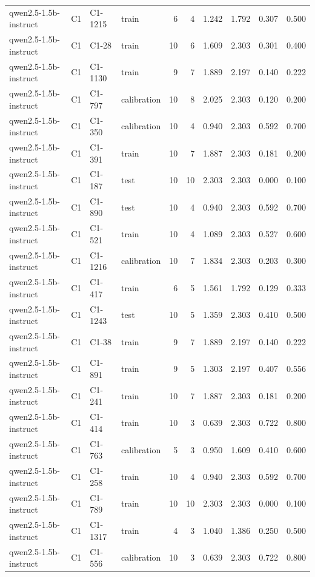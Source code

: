 \begin{table}
\begin{tabular}{llllrrrrrr}
qwen2.5-1.5b-instruct & C1 & C1-1215 & train & 6 & 4 & 1.242 & 1.792 & 0.307 & 0.500 \\
qwen2.5-1.5b-instruct & C1 & C1-28 & train & 10 & 6 & 1.609 & 2.303 & 0.301 & 0.400 \\
qwen2.5-1.5b-instruct & C1 & C1-1130 & train & 9 & 7 & 1.889 & 2.197 & 0.140 & 0.222 \\
qwen2.5-1.5b-instruct & C1 & C1-797 & calibration & 10 & 8 & 2.025 & 2.303 & 0.120 & 0.200 \\
qwen2.5-1.5b-instruct & C1 & C1-350 & calibration & 10 & 4 & 0.940 & 2.303 & 0.592 & 0.700 \\
qwen2.5-1.5b-instruct & C1 & C1-391 & train & 10 & 7 & 1.887 & 2.303 & 0.181 & 0.200 \\
qwen2.5-1.5b-instruct & C1 & C1-187 & test & 10 & 10 & 2.303 & 2.303 & 0.000 & 0.100 \\
qwen2.5-1.5b-instruct & C1 & C1-890 & test & 10 & 4 & 0.940 & 2.303 & 0.592 & 0.700 \\
qwen2.5-1.5b-instruct & C1 & C1-521 & train & 10 & 4 & 1.089 & 2.303 & 0.527 & 0.600 \\
qwen2.5-1.5b-instruct & C1 & C1-1216 & calibration & 10 & 7 & 1.834 & 2.303 & 0.203 & 0.300 \\
qwen2.5-1.5b-instruct & C1 & C1-417 & train & 6 & 5 & 1.561 & 1.792 & 0.129 & 0.333 \\
qwen2.5-1.5b-instruct & C1 & C1-1243 & test & 10 & 5 & 1.359 & 2.303 & 0.410 & 0.500 \\
qwen2.5-1.5b-instruct & C1 & C1-38 & train & 9 & 7 & 1.889 & 2.197 & 0.140 & 0.222 \\
qwen2.5-1.5b-instruct & C1 & C1-891 & train & 9 & 5 & 1.303 & 2.197 & 0.407 & 0.556 \\
qwen2.5-1.5b-instruct & C1 & C1-241 & train & 10 & 7 & 1.887 & 2.303 & 0.181 & 0.200 \\
qwen2.5-1.5b-instruct & C1 & C1-414 & train & 10 & 3 & 0.639 & 2.303 & 0.722 & 0.800 \\
qwen2.5-1.5b-instruct & C1 & C1-763 & calibration & 5 & 3 & 0.950 & 1.609 & 0.410 & 0.600 \\
qwen2.5-1.5b-instruct & C1 & C1-258 & train & 10 & 4 & 0.940 & 2.303 & 0.592 & 0.700 \\
qwen2.5-1.5b-instruct & C1 & C1-789 & train & 10 & 10 & 2.303 & 2.303 & 0.000 & 0.100 \\
qwen2.5-1.5b-instruct & C1 & C1-1317 & train & 4 & 3 & 1.040 & 1.386 & 0.250 & 0.500 \\
qwen2.5-1.5b-instruct & C1 & C1-556 & calibration & 10 & 3 & 0.639 & 2.303 & 0.722 & 0.800 \\

\end{tabular}
\end{table}
